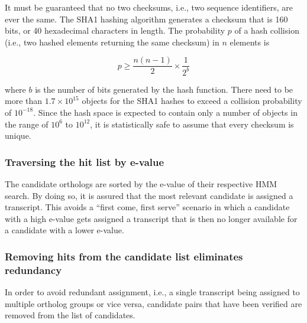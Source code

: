 It must be guaranteed that no two checksums, i.e., two sequence identifiers, are
ever the same. The SHA1 hashing algorithm generates a checksum that is 160 bits,
or 40 hexadecimal characters in length. The probability $p$ of a hash collision
(i.e., two hashed elements returning the same checksum) in $n$ elements is

\begin{equation}
p \ge \frac{n (n-1)}{2} \times \frac{1}{2^b}
\label{eq:hashcollision}
\end{equation}

where $b$ is the number of bits generated by the hash function. There need to be
more than $1.7 \times 10^{15}$ objects for the SHA1 hashes to exceed a collision
probability of $10^{-18}$. Since the hash space is expected to contain only a
number of objects in the range of $10^6$ to $10^{12}$, it is statistically safe
to assume that every checksum is unique. 

\subsubsection{Traversing the hit list by e-value}

The candidate orthologs are sorted by the e-value of their respective HMM
search. By doing so, it is assured that the most relevant candidate is assigned
a transcript. This avoids a ``first come, first serve'' scenario in which a
candidate with a high e-value gets assigned a transcript that is then no longer
available for a candidate with a lower e-value.

\subsubsection{Removing hits from the candidate list eliminates redundancy}

In order to avoid redundant assignment, i.e., a single transcript being assigned
to multiple ortholog groups or vice versa, candidate pairs that have been
verified are removed from the list of candidates. 

